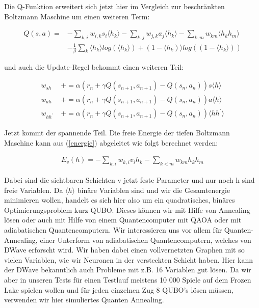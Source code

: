 Die Q-Funktion erweitert sich jetzt hier im Vergleich zur beschränkten Boltzmann Maschine um einen weiteren Term:

\begin{align}
	Q(s,a) =  	&- \sum_{k,i} w_{i,k}s_i \langle h_k \rangle  
				- \sum_{k,j} w_{j,k}a_j \langle h_k \rangle   
				- \sum_{k,m}w_{km} \langle h_k h_m \rangle \label{Qdbm1}   \\  
				&-  \frac{1}{\beta} \sum_{k} \langle h_k \rangle log(\langle h_k \rangle) + (1 -  \langle h_k) \rangle log( (1 - \langle h_k \rangle) )  \label{Qdbm2}
\end{align}

und auch die Update-Regel bekommt einen weiteren Teil:

\begin{align*}
	w_{sh} \: 			&+= \alpha ( r_n + \gamma Q(s_{n+1}, a_{n+1}) -  Q(s_n, a_n) ) s \langle h \rangle \\
	w_{ah} \: 			&+= \alpha ( r_n + \gamma Q(s_{n+1}, a_{n+1}) -  Q(s_n, a_n) ) a \langle h \rangle \\
	w_{hh^{\prime}} \: 	&+= \alpha ( r_n + \gamma Q(s_{n+1}, a_{n+1}) -  Q(s_n, a_n) ) \langle h h^{\prime} \rangle 
\end{align*}

Jetzt kommt der spannende Teil. Die freie Energie der tiefen Boltzmann Maschine kann aus (\ref{energie}) abgeleitet wie folgt berechnet werden:

\begin{align}
	E_v(h) = - \sum_{k,i}w_{k,i}v_ih_k - \sum_{k<m}w_{km}h_kh_m \label{energiedbm}
\end{align}

Dabei sind die sichtbaren Schichten v jetzt feste Parameter und nur noch h sind freie Variablen. Da $\langle h \rangle$ binäre Variablen sind und wir die Gesamtenergie minimieren wollen, handelt es sich hier also um ein quadratisches, binäres Optimierungsproblem kurz QUBO. Dieses können wir mit Hilfe von Annealing lösen oder auch mit Hilfe von einem Quantencomputer mit QAOA oder mit adiabatischen Quantencomputern. Wir interessieren uns vor allem für Quanten-Annealing, einer Unterform von adiabatischen Quantencomputern, welches von DWave erforscht wird. Wir haben dabei einen vollvernetzten Graphen mit so vielen Variablen, wie wir Neuronen in der versteckten Schicht haben. Hier kann der DWave bekanntlich auch Probleme mit z.B. 16 Variablen gut lösen. Da wir aber in unseren Tests für einen Testlauf meistens 10 000 Spiele auf dem Frozen Lake spielen wollen und für jeden einzelnen Zug 8 QUBO's lösen müssen, verwenden wir hier simuliertes Quanten Annealing.

